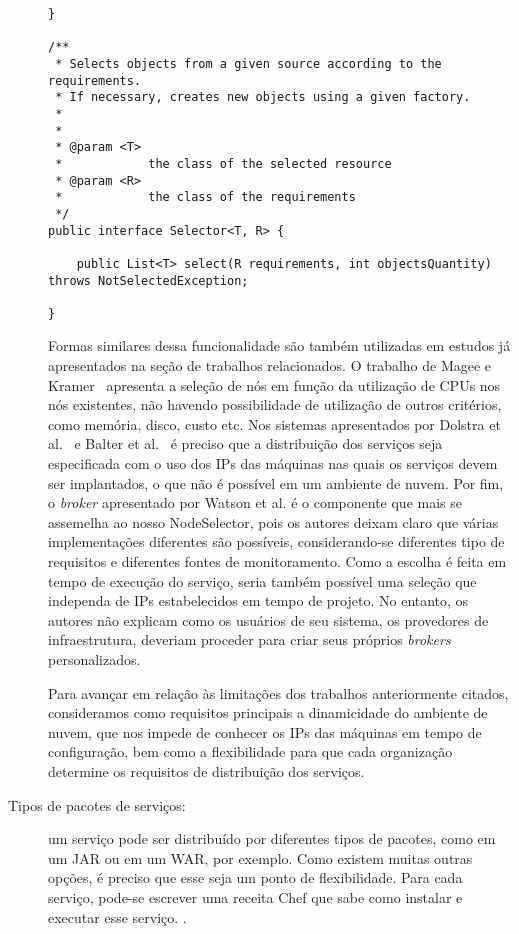 \begin{description}
\begin{lstlisting}[frame=trbl, label=lst:node_selector, caption=Interface NodeSelector acompanhada de sua classe pai Selector.]
}

/**
 * Selects objects from a given source according to the requirements. 
 * If necessary, creates new objects using a given factory.
 * 
 * 
 * @param <T>
 *            the class of the selected resource
 * @param <R>
 *            the class of the requirements
 */
public interface Selector<T, R> {

    public List<T> select(R requirements, int objectsQuantity) throws NotSelectedException;

}
\end{lstlisting}

Formas similares dessa funcionalidade são também utilizadas em estudos já apresentados na seção de trabalhos relacionados.  O trabalho de Magee e Kramer~\cite{Magee1997Corba} apresenta a seleção de nós em função da utilização de CPUs nos nós existentes, não havendo possibilidade de utilização de outros critérios, como memória, disco, custo etc. Nos sistemas apresentados por Dolstra et al.~\cite{Dolstra2005Configuration} e Balter et al.~\cite{Balter1998Olan} é preciso que a distribuição dos serviços seja especificada com o uso dos IPs das máquinas nas quais os serviços devem ser implantados, o que não é possível em um ambiente de nuvem. Por fim, o \emph{broker} apresentado por Watson et al. é o componente que mais se assemelha ao nosso NodeSelector, pois os autores deixam claro que várias implementações diferentes são possíveis, considerando-se diferentes tipo de requisitos e diferentes fontes de monitoramento. Como a escolha é feita em tempo de execução do serviço, seria também possível uma seleção que independa de IPs estabelecidos em tempo de projeto. No entanto, os autores não explicam como os usuários de seu sistema, os provedores de infraestrutura, deveriam proceder para criar seus próprios \emph{brokers} personalizados.

Para avançar em relação às limitações dos trabalhos anteriormente citados,  consideramos como requisitos principais a dinamicidade do ambiente de nuvem, que nos impede de conhecer os IPs das máquinas em tempo de configuração, bem como a flexibilidade para que cada organização determine os requisitos de distribuição dos serviços.

\item [Tipos de pacotes de serviços:] um serviço pode ser distribuído por diferentes tipos de pacotes, como em um JAR ou em um WAR, por exemplo. Como existem muitas outras opções, é preciso que esse seja um ponto de flexibilidade. Para cada serviço, pode-se escrever uma receita Chef que sabe como instalar e executar esse serviço. .


\end{description}
